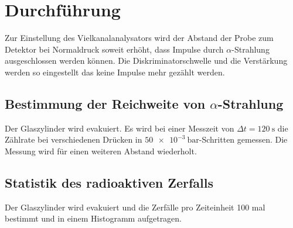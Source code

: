 \section{Durchführung}
\label{sec:Durchführung}

Zur Einstellung des Vielkanalanalysators wird der Abstand der Probe zum Detektor bei Normaldruck soweit erhöht, dass Impulse durch $\alpha$-Strahlung ausgeschlossen werden können. Die Diskriminatorschwelle und die Verstärkung werden so eingestellt das keine Impulse mehr gezählt werden.

\subsection{Bestimmung der Reichweite von $\alpha$-Strahlung}
Der Glaszylinder wird evakuiert. Es wird bei einer Messzeit von $\Delta t=\SI{120}{\second}$ die Zählrate bei verschiedenen Drücken in $\SI{50e-3}{\bar}$-Schritten gemessen.
Die Messung wird für einen weiteren Abstand wiederholt.

\subsection{Statistik des radioaktiven Zerfalls}
Der Glaszylinder wird evakuiert und die Zerfälle pro Zeiteinheit
100 mal bestimmt und in einem Histogramm aufgetragen.